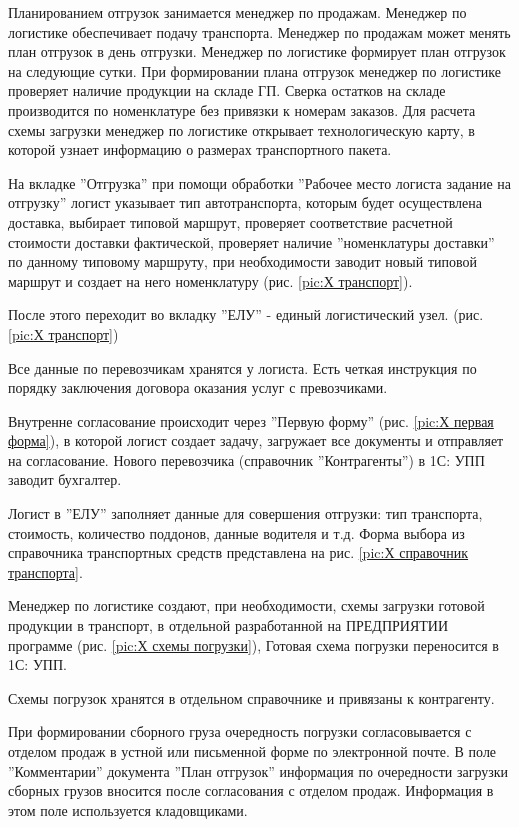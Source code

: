 Планированием отгрузок занимается менеджер по продажам. Менеджер по логистике обеспечивает подачу транспорта. Менеджер по продажам может менять план отгрузок в день отгрузки. Менеджер по логистике формирует план отгрузок на следующие сутки.
При формировании плана отгрузок менеджер по логистике проверяет наличие продукции на складе ГП. Сверка остатков на складе производится по номенклатуре без привязки к номерам заказов. Для расчета схемы загрузки менеджер по логистике открывает технологическую карту, в которой узнает информацию о размерах транспортного пакета. 

На вкладке ''Отгрузка'' при помощи обработки ''Рабочее место логиста задание на отгрузку'' логист указывает тип автотранспорта, которым будет осуществлена доставка, выбирает типовой маршрут, проверяет соответствие расчетной стоимости доставки фактической, проверяет наличие ''номенклатуры доставки'' по данному типовому маршруту, при необходимости заводит новый типовой маршрут и создает на него номенклатуру (рис. \ref{pic:Х транспорт}).

После этого переходит во вкладку ''ЕЛУ'' - единый логистический узел.
(рис. \ref{pic:Х транспорт})


Все данные по перевозчикам хранятся у логиста. 
Есть четкая инструкция по порядку заключения договора оказания услуг с превозчиками.

Внутренне согласование происходит через ''Первую форму'' (рис. \ref{pic:Х первая форма}), в которой логист создает задачу, загружает все документы и отправляет на согласование. Нового перевозчика (справочник ''Контрагенты'') в 1С: УПП заводит бухгалтер.

Логист в ''ЕЛУ'' заполняет данные для совершения отгрузки: тип транспорта, стоимость, количество поддонов, данные водителя и т.д. Форма выбора из справочника транспортных средств представлена на рис. \ref{pic:Х справочник транспорта}.

Менеджер по логистике создают, при необходимости, схемы загрузки готовой продукции в транспорт, в отдельной разработанной на ПРЕДПРИЯТИИ программе (рис. \ref{pic:Х схемы погрузки}),  Готовая схема погрузки переносится в 1С: УПП.

Схемы погрузок хранятся в отдельном справочнике и привязаны к контрагенту. 

При формировании сборного груза очередность погрузки согласовывается с отделом продаж в устной или письменной форме по электронной почте.
В поле ''Комментарии'' документа ''План отгрузок'' информация по очередности загрузки сборных грузов вносится после согласования с отделом продаж. Информация в этом поле используется кладовщиками.

